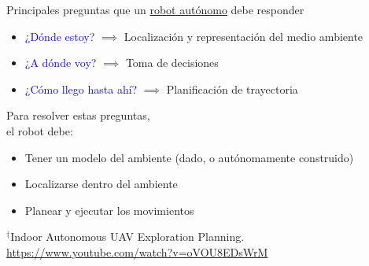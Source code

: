 \documentclass[
  24pt, %
  aspectratio=169, %
]{beamer}
\begin{document}
\begin{frame}  
  Principales preguntas que un \underline{robot autónomo} debe responder \footnotemark
  \bigskip %
  \begin{itemize}
  \item \textcolor{blue}{¿Dónde estoy?} $\implies$ Localización y representación del medio ambiente \pause 
  \item \textcolor{blue}{¿A dónde voy?} $\implies$ Toma de decisiones \pause  %
  \item \textcolor{blue}{¿Cómo llego hasta ahí?} $\implies$ Planificación de trayectoria 
  \end{itemize}
  \pause

  \begin{minipage}{0.47\textwidth}
    Para resolver estas preguntas,\\
    el robot debe: 
    
    \begin{itemize}
    \item Tener un modelo del ambiente (dado, o autónomamente construido)
    \item Localizarse dentro del ambiente
    \item Planear y ejecutar los movimientos
    \end{itemize}
    
  \end{minipage}
  \hspace{0.2cm}
  \begin{minipage}{0.5\textwidth}
    \centering
    \rule{0in}{1.2em}$^\dag$\scriptsize Indoor Autonomous UAV Exploration Planning.\\
    \tiny \url{https://www.youtube.com/watch?v=oVOU8EDsWrM} 
  \end{minipage}
\end{frame}
\end{document}
